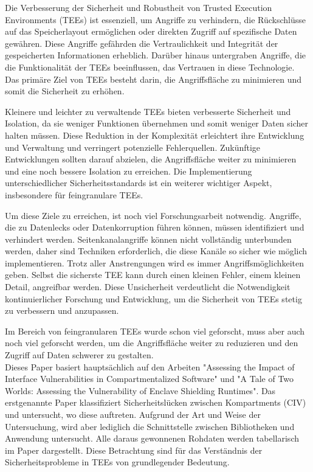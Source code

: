 
Die Verbesserung der Sicherheit und Robustheit von Trusted Execution Environments (TEEs) ist essenziell, um Angriffe zu verhindern, die Rückschlüsse auf das Speicherlayout ermöglichen oder direkten Zugriff auf spezifische Daten gewähren. Diese Angriffe gefährden die Vertraulichkeit und Integrität der gespeicherten Informationen erheblich. Darüber hinaus untergraben Angriffe, die die Funktionalität der TEEs beeinflussen, das Vertrauen in diese Technologie. Das primäre Ziel von TEEs besteht darin, die Angriffsfläche zu minimieren und somit die Sicherheit zu erhöhen.

Kleinere und leichter zu verwaltende TEEs bieten verbesserte Sicherheit und Isolation, da sie weniger Funktionen übernehmen und somit weniger Daten sicher halten müssen. Diese Reduktion in der Komplexität erleichtert ihre Entwicklung und Verwaltung und verringert potenzielle Fehlerquellen. Zukünftige Entwicklungen sollten darauf abzielen, die Angriffsfläche weiter zu minimieren und eine noch bessere Isolation zu erreichen. Die Implementierung unterschiedlicher Sicherheitsstandards ist ein weiterer wichtiger Aspekt, insbesondere für feingranulare TEEs.

Um diese Ziele zu erreichen, ist noch viel Forschungsarbeit notwendig. 
Angriffe, die zu Datenlecks oder Datenkorruption führen können, müssen identifiziert und verhindert werden. Seitenkanalangriffe können nicht vollständig unterbunden werden, daher sind Techniken erforderlich, die diese Kanäle so sicher wie möglich implementieren. 
Trotz aller Anstrengungen wird es immer Angriffsmöglichkeiten geben. Selbst die sicherste TEE kann durch einen kleinen Fehler, einem kleinen Detail, angreifbar werden. Diese Unsicherheit verdeutlicht die Notwendigkeit kontinuierlicher Forschung und Entwicklung, um die Sicherheit von TEEs stetig zu verbessern und anzupassen.

Im Bereich von feingranularen TEEs wurde schon viel geforscht, muss aber auch noch viel geforscht werden, um die Angriffsfläche weiter zu reduzieren und den Zugriff auf Daten schwerer zu gestalten.
\\
Dieses Paper basiert hauptsächlich auf den Arbeiten "Assessing the Impact of Interface Vulnerabilities in Compartmentalized Software"\cite{CIVPaper} und "A Tale of Two Worlds: Assessing the Vulnerability of Enclave Shielding Runtimes"\cite{TEEPaper}. 
Das erstgenannte Paper klassifiziert Sicherheitslücken zwischen Kompartments (CIV) und untersucht, wo diese auftreten. Aufgrund der Art und Weise der Untersuchung, wird aber lediglich die Schnittstelle zwischen Bibliotheken und Anwendung untersucht. 
Alle daraus gewonnenen Rohdaten werden tabellarisch im Paper dargestellt. 
Diese Betrachtung sind für das Verständnis der Sicherheitsprobleme in TEEs von grundlegender Bedeutung.

